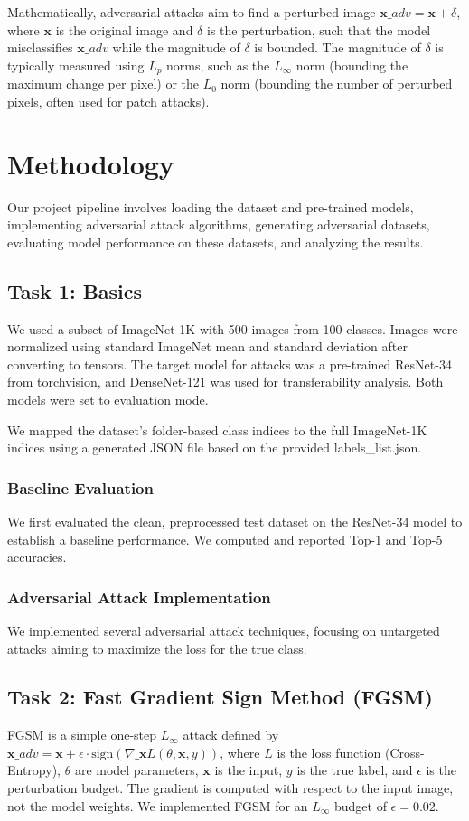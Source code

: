 \documentclass[letterpaper]{article}
\begin{document}
Mathematically, adversarial attacks aim to find a perturbed image $\mathbf{x}\_{adv} = \mathbf{x} + \delta$, where $\mathbf{x}$ is the original image and $\delta$ is the perturbation, such that the model misclassifies $\mathbf{x}\_{adv}$ while the magnitude of $\delta$ is bounded. The magnitude of $\delta$ is typically measured using $L_p$ norms, such as the $L_\infty$ norm (bounding the maximum change per pixel) or the $L_0$ norm (bounding the number of perturbed pixels, often used for patch attacks).

\section{Methodology}

Our project pipeline involves loading the dataset and pre-trained models, implementing adversarial attack algorithms, generating adversarial datasets, evaluating model performance on these datasets, and analyzing the results.

\subsection{Task 1: Basics}
We used a subset of ImageNet-1K with 500 images from 100 classes. Images were normalized using standard ImageNet mean and standard deviation after converting to tensors. The target model for attacks was a pre-trained ResNet-34 from torchvision, and DenseNet-121 was used for transferability analysis. Both models were set to evaluation mode.

We mapped the dataset's folder-based class indices to the full ImageNet-1K indices using a generated JSON file based on the provided labels\_list.json.

\subsubsection{Baseline Evaluation}
We first evaluated the clean, preprocessed test dataset on the ResNet-34 model to establish a baseline performance. We computed and reported Top-1 and Top-5 accuracies.

\subsubsection{Adversarial Attack Implementation}
We implemented several adversarial attack techniques, focusing on untargeted attacks aiming to maximize the loss for the true class.

\subsection{Task 2: Fast Gradient Sign Method (FGSM)}
FGSM is a simple one-step $L_\infty$ attack defined by $\mathbf{x}\_{adv} = \mathbf{x} + \epsilon \cdot \text{sign}(\nabla\_{\mathbf{x}} L(\theta, \mathbf{x}, y))$, where $L$ is the loss function (Cross-Entropy), $\theta$ are model parameters, $\mathbf{x}$ is the input, $y$ is the true label, and $\epsilon$ is the perturbation budget. The gradient is computed with respect to the input image, not the model weights. We implemented FGSM for an $L_\infty$ budget of $\epsilon = 0.02$.
\end{document}
